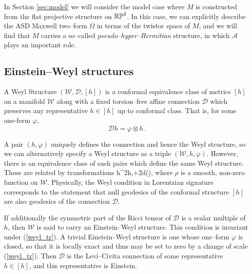 In Section \ref{sec:model} we will consider the model case where $M$ is constructed from the flat projective structure on $\mathbb{RP}^2$. In this case, we can explicitly describe the ASD Maxwell two--form $\Omega$ in terms of the twistor space of $M$,
and we will find that $M$ carries a so--called \textit{pseudo--hyper--Hermitian} structure, in which $\mathcal{A}$ plays an important role.












\subsection{Einstein--Weyl structures}
\begin{defi}
A Weyl Structure $(\mathcal{W},\mathscr{D},[h])$ is a conformal equivalence class of metrics $[h]$ on a manifold $\mathcal{W}$ along with a fixed torsion--free affine connection $\mathscr{D}$ which preserves any representative $h\in[h]$ up to conformal class. That is, for some one-form $\varphi$,
\[
\mathscr{D}h=\varphi\otimes h.
\]
\end{defi}
A pair $(h,\varphi)$ uniquely defines the connection and hence the Weyl structure, so we can alternatively specify a Weyl structure as a triple $(\mathcal{W},h,\varphi)$. However, there is an equivalence class of such pairs which define the same Weyl structure. These are related by transformations
\be
\label{weyl_tr}
h\rightarrow \rho^2h,\quad\varphi\rightarrow\varphi+2d(\rho),
\ee
where $\rho$ is a smooth, non-zero function on $\mathcal{W}$. 
Physically, the Weyl condition in Lorentzian signature corresponds to the statement that null geodesics of the conformal structure $[h]$ are also geodesics of the connection $\mathscr{D}$.

If additionally the symmetric part of the Ricci tensor of $\mathscr{D}$ is a scalar multiple of $h$, then $\mathcal{W}$ is said to carry an Einstein--Weyl structure.
This condition is invariant under (\ref{weyl_tr}). A trivial Einstein--Weyl structure is one whose one--form $\varphi$ is closed, so that it is locally exact and thus may be set to zero by a change of scale (\ref{weyl_tr}). Then $\mathscr{D}$ is the Levi--Civita connection of some representative $h\in[h]$, and this representative is Einstein.

